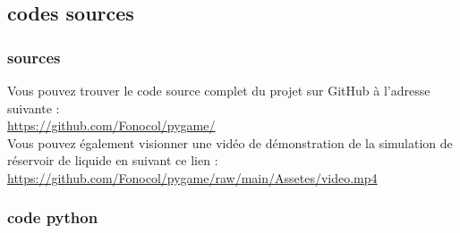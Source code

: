 \documentclass{article}
\begin{document}
\clearpage
\subsection{codes sources}

\subsubsection{sources}
\begin{center}
    Vous pouvez trouver le code source complet du projet sur GitHub à l'adresse suivante : \\
\url{https://github.com/Fonocol/pygame/}\\
\vspace{1cm}
Vous pouvez également visionner une vidéo de démonstration de la simulation de réservoir de liquide en suivant ce lien : \\
\url{https://github.com/Fonocol/pygame/raw/main/Assetes/video.mp4}
\end{center}

\clearpage
\subsubsection{code python}

\end{document}
